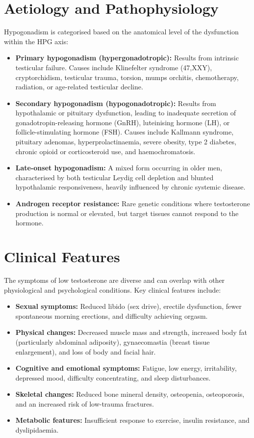\section*{Aetiology and Pathophysiology}
Hypogonadism is categorised based on the anatomical level of the dysfunction within the HPG axis:
\begin{itemize}
    \item \textbf{Primary hypogonadism (hypergonadotropic):} Results from intrinsic testicular failure. Causes include Klinefelter syndrome (47,XXY), cryptorchidism, testicular trauma, torsion, mumps orchitis, chemotherapy, radiation, or age-related testicular decline.
    \item \textbf{Secondary hypogonadism (hypogonadotropic):} Results from hypothalamic or pituitary dysfunction, leading to inadequate secretion of gonadotropin-releasing hormone (GnRH), luteinising hormone (LH), or follicle-stimulating hormone (FSH). Causes include Kallmann syndrome, pituitary adenomas, hyperprolactinaemia, severe obesity, type 2 diabetes, chronic opioid or corticosteroid use, and haemochromatosis.
    \item \textbf{Late-onset hypogonadism:} A mixed form occurring in older men, characterised by both testicular Leydig cell depletion and blunted hypothalamic responsiveness, heavily influenced by chronic systemic disease.
    \item \textbf{Androgen receptor resistance:} Rare genetic conditions where testosterone production is normal or elevated, but target tissues cannot respond to the hormone.
\end{itemize}

\section*{Clinical Features}
The symptoms of low testosterone are diverse and can overlap with other physiological and psychological conditions. Key clinical features include:
\begin{itemize}
    \item \textbf{Sexual symptoms:} Reduced libido (sex drive), erectile dysfunction, fewer spontaneous morning erections, and difficulty achieving orgasm.
    \item \textbf{Physical changes:} Decreased muscle mass and strength, increased body fat (particularly abdominal adiposity), gynaecomastia (breast tissue enlargement), and loss of body and facial hair.
    \item \textbf{Cognitive and emotional symptoms:} Fatigue, low energy, irritability, depressed mood, difficulty concentrating, and sleep disturbances.
    \item \textbf{Skeletal changes:} Reduced bone mineral density, osteopenia, osteoporosis, and an increased risk of low-trauma fractures.
    \item \textbf{Metabolic features:} Insufficient response to exercise, insulin resistance, and dyslipidaemia.
\end{itemize}

